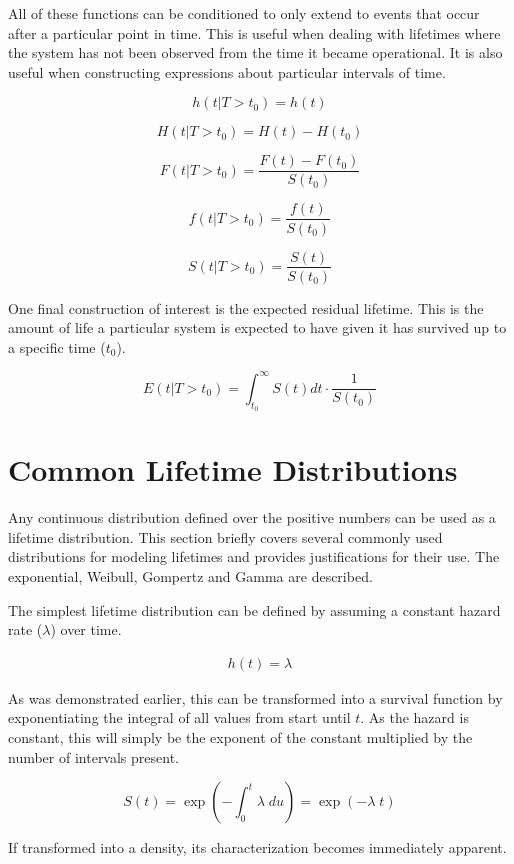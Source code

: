 All of these functions can be conditioned to only extend to events that occur after a particular point in time. This is useful when dealing with lifetimes where the system has not been observed from the time it became operational. It is also useful when constructing expressions about particular intervals of time\cite{Cleves2008}.

$$ h(t|T > t_0) = h(t) $$

$$ H(t|T > t_0) = H(t) - H(t_0) $$

$$ F(t|T > t_0) = \frac{F(t) - F(t_0)}{S(t_0)} $$

$$ f(t|T > t_0) = \frac{f(t)}{S(t_0)} $$

$$ S(t|T > t_0) = \frac{S(t)}{S(t_0)} $$

One final construction of interest is the expected residual lifetime. This is the amount of life a particular system is expected to have given it has survived up to a specific time ($t_0$).

$$ E(t|T > t_0) = \int^\infty_{t_0} S(t) dt \cdot \frac{1}{S(t_0)} $$


\section*{Common Lifetime Distributions}


Any continuous distribution defined over the positive numbers can be used as a lifetime distribution. This section briefly covers several commonly used distributions for modeling lifetimes and provides justifications for their use. The exponential, Weibull, Gompertz and Gamma are described.

The simplest lifetime distribution can be defined by assuming a constant hazard rate ($\lambda$) over time.

\begin{align*}
h(t) = \lambda \tag{ $\lambda > 0$}
\end{align*}

As was demonstrated earlier, this can be transformed into a survival function by exponentiating the integral of all values from start until $t$. As the hazard is constant, this will simply be the exponent of the constant multiplied by the number of intervals present.

$$ S(t) = \exp \left (- \int_0^t \lambda\; du  \right ) = \exp (- \lambda\; t )$$

If transformed into a density, its characterization becomes immediately apparent.

